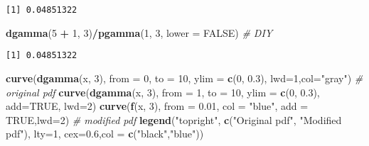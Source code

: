 \documentclass[]{book}
\newenvironment{Shaded}{\begin{snugshade}}{\end{snugshade}}
\newcommand{\KeywordTok}[1]{\textcolor[rgb]{0.13,0.29,0.53}{\textbf{#1}}}
\newcommand{\DataTypeTok}[1]{\textcolor[rgb]{0.13,0.29,0.53}{#1}}
\newcommand{\DecValTok}[1]{\textcolor[rgb]{0.00,0.00,0.81}{#1}}
\newcommand{\FloatTok}[1]{\textcolor[rgb]{0.00,0.00,0.81}{#1}}
\newcommand{\StringTok}[1]{\textcolor[rgb]{0.31,0.60,0.02}{#1}}
\newcommand{\CommentTok}[1]{\textcolor[rgb]{0.56,0.35,0.01}{\textit{#1}}}
\newcommand{\OtherTok}[1]{\textcolor[rgb]{0.56,0.35,0.01}{#1}}
\newcommand{\OperatorTok}[1]{\textcolor[rgb]{0.81,0.36,0.00}{\textbf{#1}}}
\newcommand{\NormalTok}[1]{#1}
\theoremstyle{definition}
\theoremstyle{definition}
\theoremstyle{definition}
\theoremstyle{remark}
\begin{document}
\begin{verbatim}
[1] 0.04851322
\end{verbatim}

\begin{Shaded}
\begin{Highlighting}[]
\KeywordTok{dgamma}\NormalTok{(}\DecValTok{5} \OperatorTok{+}\StringTok{ }\DecValTok{1}\NormalTok{, }\DecValTok{3}\NormalTok{)}\OperatorTok{/}\KeywordTok{pgamma}\NormalTok{(}\DecValTok{1}\NormalTok{, }\DecValTok{3}\NormalTok{, }\DataTypeTok{lower =} \OtherTok{FALSE}\NormalTok{) }\CommentTok{# DIY}
\end{Highlighting}
\end{Shaded}

\begin{verbatim}
[1] 0.04851322
\end{verbatim}

\begin{Shaded}
\begin{Highlighting}[]
\KeywordTok{curve}\NormalTok{(}\KeywordTok{dgamma}\NormalTok{(x, }\DecValTok{3}\NormalTok{), }\DataTypeTok{from =} \DecValTok{0}\NormalTok{, }\DataTypeTok{to =} \DecValTok{10}\NormalTok{, }\DataTypeTok{ylim =} \KeywordTok{c}\NormalTok{(}\DecValTok{0}\NormalTok{, }\FloatTok{0.3}\NormalTok{), }\DataTypeTok{lwd=}\DecValTok{1}\NormalTok{,}\DataTypeTok{col=}\StringTok{"gray"}\NormalTok{)  }\CommentTok{# original pdf}
\KeywordTok{curve}\NormalTok{(}\KeywordTok{dgamma}\NormalTok{(x, }\DecValTok{3}\NormalTok{), }\DataTypeTok{from =} \DecValTok{1}\NormalTok{, }\DataTypeTok{to =} \DecValTok{10}\NormalTok{, }\DataTypeTok{ylim =} \KeywordTok{c}\NormalTok{(}\DecValTok{0}\NormalTok{, }\FloatTok{0.3}\NormalTok{), }\DataTypeTok{add=}\OtherTok{TRUE}\NormalTok{, }\DataTypeTok{lwd=}\DecValTok{2}\NormalTok{) }
\KeywordTok{curve}\NormalTok{(}\KeywordTok{f}\NormalTok{(x, }\DecValTok{3}\NormalTok{), }\DataTypeTok{from =} \FloatTok{0.01}\NormalTok{, }\DataTypeTok{col =} \StringTok{"blue"}\NormalTok{, }\DataTypeTok{add =} \OtherTok{TRUE}\NormalTok{,}\DataTypeTok{lwd=}\DecValTok{2}\NormalTok{)     }\CommentTok{# modified pdf}
\KeywordTok{legend}\NormalTok{(}\StringTok{"topright"}\NormalTok{, }\KeywordTok{c}\NormalTok{(}\StringTok{"Original pdf"}\NormalTok{, }\StringTok{"Modified pdf"}\NormalTok{), }\DataTypeTok{lty=}\DecValTok{1}\NormalTok{, }\DataTypeTok{cex=}\FloatTok{0.6}\NormalTok{,}\DataTypeTok{col =} \KeywordTok{c}\NormalTok{(}\StringTok{"black"}\NormalTok{,}\StringTok{"blue"}\NormalTok{))}
\end{Highlighting}
\end{Shaded}
\end{document}
